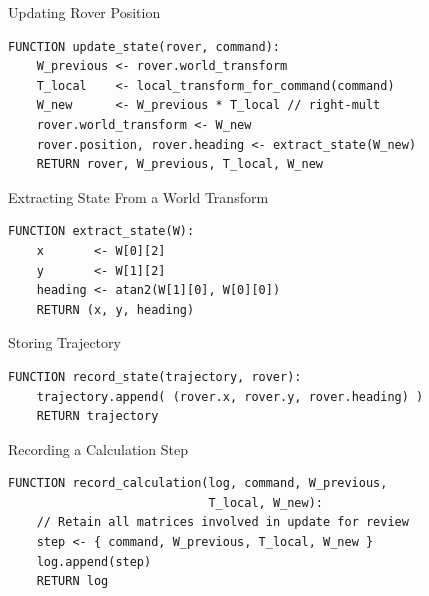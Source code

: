 \documentclass[12pt]{report}
\begin{document}
\begin{pseudobox}{Updating Rover Position}
\begin{verbatim}
FUNCTION update_state(rover, command):
    W_previous <- rover.world_transform
    T_local    <- local_transform_for_command(command)
    W_new      <- W_previous * T_local // right-mult
    rover.world_transform <- W_new
    rover.position, rover.heading <- extract_state(W_new)
    RETURN rover, W_previous, T_local, W_new
\end{verbatim}
\end{pseudobox}

\begin{pseudobox}{Extracting State From a World Transform}
\begin{verbatim}
FUNCTION extract_state(W):
    x       <- W[0][2]
    y       <- W[1][2]
    heading <- atan2(W[1][0], W[0][0])
    RETURN (x, y, heading)
\end{verbatim}
\end{pseudobox}

\begin{pseudobox}{Storing Trajectory}
\begin{verbatim}
FUNCTION record_state(trajectory, rover):
    trajectory.append( (rover.x, rover.y, rover.heading) )
    RETURN trajectory
\end{verbatim}
\end{pseudobox}

\begin{pseudobox}{Recording a Calculation Step}
\begin{verbatim}
FUNCTION record_calculation(log, command, W_previous,
                            T_local, W_new):
    // Retain all matrices involved in update for review
    step <- { command, W_previous, T_local, W_new }
    log.append(step)
    RETURN log
\end{verbatim}
\end{pseudobox}
\end{document}
